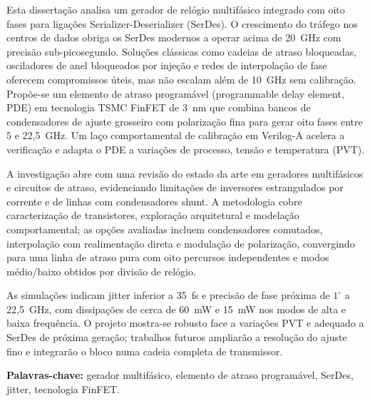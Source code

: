 Esta dissertação analisa um gerador de relógio multifásico integrado com oito fases para ligações Serializer-Deserializer (SerDes). O crescimento do tráfego nos centros de dados obriga os SerDes modernos a operar acima de 20~GHz com precisão sub-picosegundo. Soluções clássicas como cadeias de atraso bloqueadas, osciladores de anel bloqueados por injeção e redes de interpolação de fase oferecem compromissos úteis, mas não escalam além de 10~GHz sem calibração. Propõe-se um elemento de atraso programável (programmable delay element, PDE) em tecnologia TSMC FinFET de 3~nm que combina bancos de condensadores de ajuste grosseiro com polarização fina para gerar oito fases entre 5 e 22{,}5~GHz. Um laço comportamental de calibração em Verilog-A acelera a verificação e adapta o PDE a variações de processo, tensão e temperatura (PVT).

A investigação abre com uma revisão do estado da arte em geradores multifásicos e circuitos de atraso, evidenciando limitações de inversores estrangulados por corrente e de linhas com condensadores shunt. A metodologia cobre caracterização de transistores, exploração arquitetural e modelação comportamental; as opções avaliadas incluem condensadores comutados, interpolação com realimentação direta e modulação de polarização, convergindo para uma linha de atraso pura com oito percursos independentes e modos médio/baixo obtidos por divisão de relógio.

As simulações indicam jitter inferior a 35~fs e precisão de fase próxima de $1^{\circ}$ a 22{,}5~GHz, com dissipações de cerca de 60~mW e 15~mW nos modos de alta e baixa frequência. O projeto mostra-se robusto face a variações PVT e adequado a SerDes de próxima geração; trabalhos futuros ampliarão a resolução do ajuste fino e integrarão o bloco numa cadeia completa de transmissor.

\medskip
\noindent\textbf{Palavras-chave:} gerador multifásico, elemento de atraso programável, SerDes, jitter, tecnologia FinFET.
